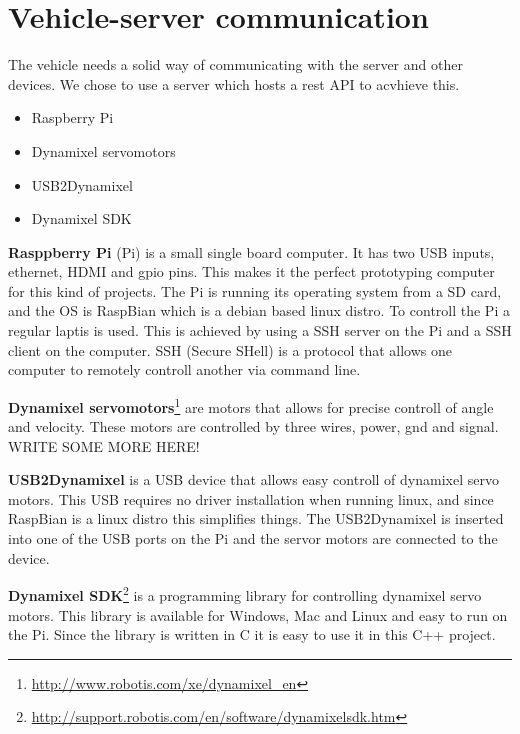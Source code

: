 \section{Vehicle-server communication}
The vehicle needs a solid way of communicating with the server and other devices. We chose to use a server which hosts a rest API to acvhieve this. 
\begin{itemize}
    \item Raspberry Pi
    \item Dynamixel servomotors
    \item USB2Dynamixel
    \item Dynamixel SDK
\end{itemize}
\vspace{\secspace}

\textbf{Rasppberry Pi} (Pi) is a small single board computer. 
It has two USB inputs, ethernet, HDMI and gpio pins. 
This makes it the perfect prototyping computer for this kind of projects. 
The Pi is running its operating system from a SD card, and the OS is RaspBian which is a debian based linux distro. 
To controll the Pi a regular laptis is used. 
This is achieved by using a SSH server on the Pi and a SSH client on the computer. 
SSH (Secure SHell) is a protocol that allows one computer to remotely controll another via command line. 
\vspace{\secspace}

\textbf{Dynamixel servomotors}\footnote{\url{http://www.robotis.com/xe/dynamixel_en}} are motors that allows for precise controll of angle and velocity. 
These motors are controlled by three wires, power, gnd and signal. WRITE SOME MORE HERE!
\vspace{\secspace}

\textbf{USB2Dynamixel} is a USB device that allows easy controll of dynamixel servo motors. 
This USB requires no driver installation when running linux, and since RaspBian is a linux distro this simplifies things. 
The USB2Dynamixel is inserted into one of the USB ports on the Pi and the servor motors are connected to the device. 
\vspace{\secspace}

\textbf{Dynamixel SDK}\footnote{\url{http://support.robotis.com/en/software/dynamixelsdk.htm}} is a programming library for controlling dynamixel servo motors. 
This library is available for Windows, Mac and Linux and easy to run on the Pi. 
Since the library is written in C it is easy to use it in this C++ project. 

